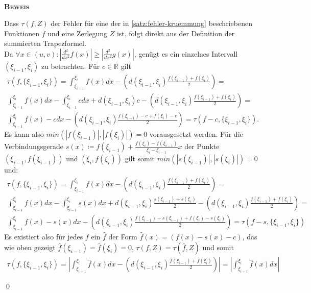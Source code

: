 \documentclass[12pt,a4paper]{scrartcl}
\numberwithin{equation}{section}
\numberwithin{myalgctr}{section}
\numberwithin{mytheoremctr}{subsection}
\numberwithin{mykorollarctr}{subsection}
\numberwithin{mylemmactr}{subsection}
\numberwithin{mybeispielctr}{subsection}
\newenvironment{myproof}{%
	\bigskip\noindent%
	\textsc{\textbf{\\Beweis\\}}%
	\indent
}{\qed\par\bigskip}  %
\begin{document}
	\begin{myproof}
		Dass $\tau(f,Z)$ der Fehler f\"ur eine der in \cref{satz:fehler-kruemmung} beschriebenen Funktionen $f$ und eine Zerlegung $Z$ ist, folgt direkt aus der Definition der summierten Trapezformel. \\
		Da $\forall x\in (u,v): |\frac{d^2}{dx^2}f(x)|\geq |\frac{d^2}{dx^2}g(x)|$, gen\"ugt es ein einzelnes Intervall $(\xi_{i-1},\xi_i)$ zu betrachten. F\"ur $c\in\mathbb{R}$ gilt 
		\begin{gather*}
		\tau(f,\{\xi_{i-1},\xi_i\}) = \int_{\xi_{i-1}}^{\xi_i}f(x)dx - \left(d(\xi_{i-1},\xi_i)\frac{f(\xi_{i-1})+f(\xi_i)}{2}\right) =\\
		\int_{\xi_{i-1}}^{\xi_i}f(x)dx - \int_{\xi_{i-1}}^{\xi_i}cdx + d(\xi_{i-1},\xi_i)c - \left(d(\xi_{i-1},\xi_i)\frac{f(\xi_{i-1})+f(\xi_i)}{2}\right) = \\
		\int_{\xi_{i-1}}^{\xi_i}f(x) - cdx  - \left(d(\xi_{i-1},\xi_i)\frac{f(\xi_{i-1})-c+f(\xi_i)-c}{2}\right) = \tau(f-c,\{\xi_{i-1},\xi_i\}).
		\end{gather*}
		Es kann also $min(|f(\xi_{i-1})|,|f(\xi_{i})|) = 0$ vorausgesetzt werden. F\"ur die Verbindungsgerade $s(x)\coloneqq f(\xi_{i-1}) + \frac{f(\xi_{i}) - f(\xi_{i-1})}{\xi_{i} - \xi_{i-1}}x$ der Punkte $(\xi_{i-1},f(\xi_{i-1}))$ und $(\xi_{i},f(\xi_{i}))$ gilt somit $min(|s(\xi_{i-1})|, |s(\xi_{i})|) = 0$ und:
		\begin{gather*}
		\tau(f,\{\xi_{i-1},\xi_i\}) =\int_{\xi_{i-1}}^{\xi_i}f(x)dx - \left(d(\xi_{i-1},\xi_i)\frac{f(\xi_{i-1})+f(\xi_i)}{2}\right) =\\
		\int_{\xi_{i-1}}^{\xi_i}f(x)dx - \int_{\xi_{i-1}}^{\xi_i}s(x)dx + d(\xi_{i-1},\xi_i)\frac{s(\xi_{i-1})+s(\xi_i)}{2} - \left(d(\xi_{i-1},\xi_i)\frac{f(\xi_{i-1})+f(\xi_i)}{2}\right) = \\
		\int_{\xi_{i-1}}^{\xi_i}f(x) - s(x)dx  - \left(d(\xi_{i-1},\xi_i)\frac{f(\xi_{i-1})-s(\xi_{i-1})+f(\xi_i)-s(\xi_i)}{2}\right) = \tau(f-s,\{\xi_{i-1},\xi_i\})
		\end{gather*} 
		Es existiert also f\"ur jedes $f$  ein  $\hat{f}$ der Form $\hat{f}(x)=(f(x) - s(x) - c)$, das wie oben gezeigt $\hat{f}(\xi_{i-1}) = \hat{f}(\xi_{i}) = 0$, $\tau(f,Z) = \tau(\hat{f},Z)$ und somit
		\begin{align*}
			\tau(f,\{\xi_{i-1},\xi_i\}) = \left|\int_{\xi_{i-1}}^{\xi_i}\hat{f}(x)dx - \left(d(\xi_{i-1},\xi_i)\frac{\hat{f}(\xi_{i-1})+\hat{f}(\xi_i)}{2}\right)\right| = \left|\int_{\xi_{i-1}}^{\xi_i}\hat{f}(x)dx\right|
		\end{align*}

\end{myproof}
\end{document}
